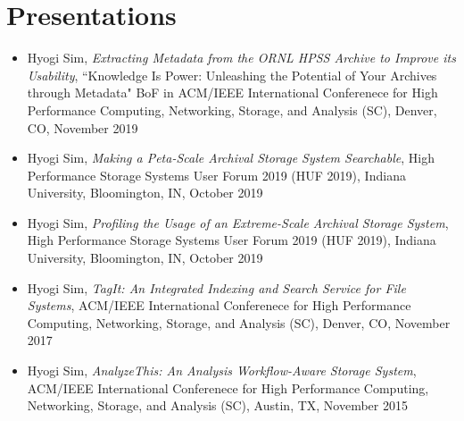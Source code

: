 \section{Presentations}

\begin{itemize}
\item {Hyogi Sim, \emph{Extracting Metadata from the ORNL HPSS Archive to
       Improve its Usability},
       ``{Knowledge Is Power: Unleashing the Potential of Your Archives
       through Metadata}" BoF in ACM/IEEE International Conferenece for
       High Performance Computing, Networking, Storage, and Analysis (SC), Denver, CO, November 2019}
\item {Hyogi Sim, \emph{Making a Peta-Scale Archival Storage System Searchable},
       High Performance Storage Systems User Forum 2019 (HUF 2019),
       Indiana University, Bloomington, IN, October 2019}
\item {Hyogi Sim, \emph{Profiling the Usage of an Extreme-Scale Archival Storage System},
       High Performance Storage Systems User Forum 2019 (HUF 2019),
       Indiana University, Bloomington, IN, October 2019}
\item {Hyogi Sim, \emph{TagIt: An Integrated Indexing and Search Service for File Systems},
       ACM/IEEE International Conferenece for
       High Performance Computing, Networking, Storage, and Analysis (SC), Denver, CO, November 2017}
\item {Hyogi Sim, \emph{AnalyzeThis: An Analysis Workflow-Aware Storage System},
       ACM/IEEE International Conferenece for
       High Performance Computing, Networking, Storage, and Analysis (SC), Austin, TX, November 2015}

       
\end{itemize}
